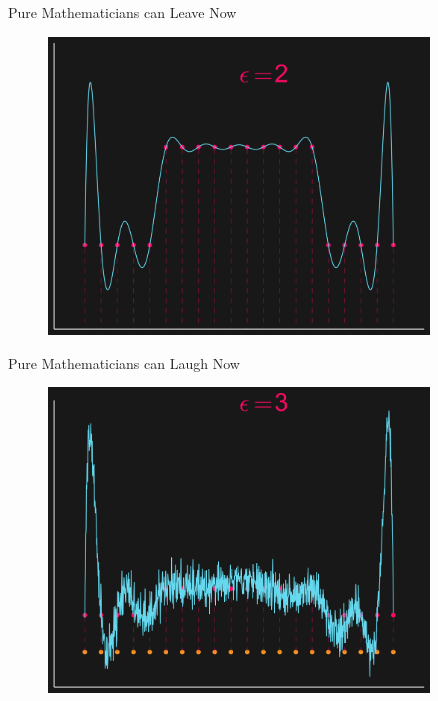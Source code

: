\documentclass[12pt,t]{beamer}
\begin{document}
\begin{frame}{Pure Mathematicians can Leave Now}

\begin{figure}
\includegraphics[width=0.9\textwidth, keepaspectratio]{illconditioned.png}
\end{figure}


\note{}
\end{frame}

\begin{frame}{Pure Mathematicians can Laugh Now}

\begin{figure}
\includegraphics[width=0.9\textwidth, keepaspectratio]{veryillconditioned.png}
\end{figure}


\note{}
\end{frame}
\end{document}
